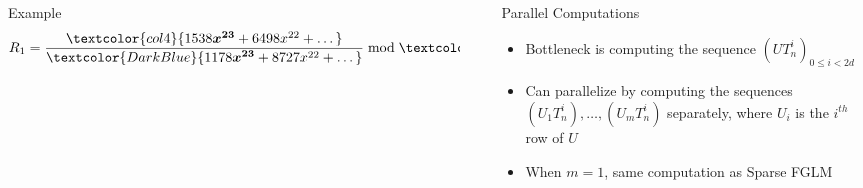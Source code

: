 \documentclass[final]{beamer}
\newlength{\sepwid}
\newlength{\onecolwid}
\newlength{\twocolwid}
\begin{document}
\begin{frame}[t]
\begin{columns}[t]
\begin{column}{\twocolwid}
\begin{alertblock}{{\sf Example}}
	$$R_1 =\frac{ \textcolor{col4}{  1538\boldsymbol{x^{23}} + 6498x^{22} + \dots }}{  \textcolor{DarkBlue}{1178\boldsymbol{x^{23}} + 8727x^{22} + \dots} } \bmod \textcolor{DarkGreen}{{\boldsymbol{x^{8}} + 6990x^{7}+ \dots }} = 7964{\bf x^7} + 4071x^6 + \dots$$


        \end{alertblock}


\end{column} %

\begin{column}{\sepwid}\end{column} %

\begin{column}{\onecolwid} %

\begin{alertblock}{Parallel Computations}
	\begin{itemize}
		\item Bottleneck is computing the sequence $(UT_n^i)_{0 \le i < 2d}$
		\item Can parallelize by computing the sequences $(U_1T_n^i),\dots,(U_mT_n^i)$
		separately, where $U_i$ is the $i^{th}$ row of $U$
		\item When $m=1$, same computation as Sparse FGLM
	\end{itemize}
\end{alertblock}








\end{column}
\end{columns}
\end{frame}
\end{document}
